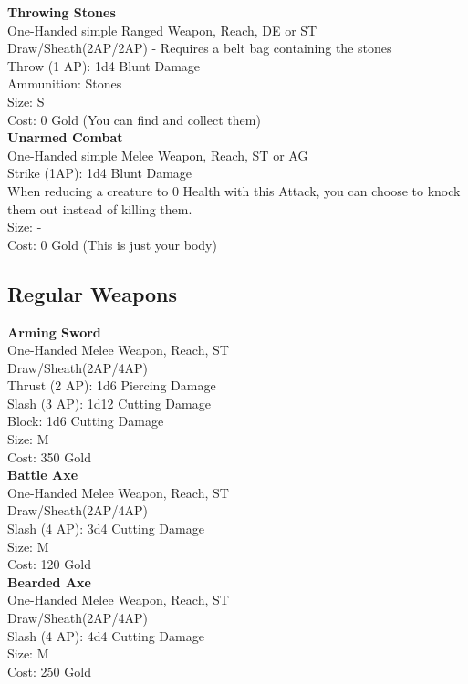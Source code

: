 \textbf{Throwing Stones}\label{weapon:throwingStones}\\
One-Handed simple Ranged Weapon,  Reach, DE or ST\\
Draw/Sheath(2AP/2AP) - Requires a belt bag containing the stones\\
Throw (1 AP): 1d4 Blunt Damage\\
Ammunition: Stones\\
Size: S\\
Cost: 0 Gold (You can find and collect them)\\

\textbf{Unarmed Combat}\label{weapon:unarmedCombat}\\
One-Handed simple Melee Weapon,  Reach, ST or AG\\
Strike (1AP): 1d4 Blunt Damage\\
When reducing a creature to 0 Health with this Attack, you can choose to knock them out instead of killing them.\\
Size: -\\
Cost: 0 Gold (This is just your body)\\


\subsection{Regular Weapons}\label{subsec:regularWeapons}
\textbf{Arming Sword}\label{weapon:armingSword}\\
One-Handed Melee Weapon,  Reach, ST\\
Draw/Sheath(2AP/4AP)\\
Thrust (2 AP): 1d6 Piercing Damage\\
Slash (3 AP): 1d12 Cutting Damage\\
Block: 1d6 Cutting Damage\\
Size: M\\
Cost: 350 Gold\\

\textbf{Battle Axe}\label{weapon:battleAxe}\\
One-Handed Melee Weapon,  Reach, ST\\
Draw/Sheath(2AP/4AP)\\
Slash (4 AP): 3d4 Cutting Damage\\
Size: M\\
Cost: 120 Gold\\

\textbf{Bearded Axe}\label{weapon:beardedAxe}\\
One-Handed Melee Weapon,  Reach, ST\\
Draw/Sheath(2AP/4AP)\\
Slash (4 AP): 4d4 Cutting Damage\\
Size: M\\
Cost: 250 Gold\\

